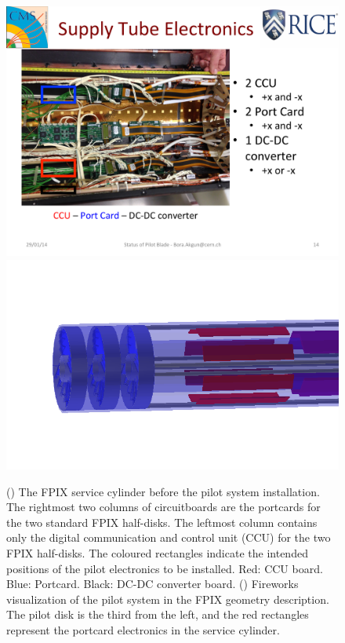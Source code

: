 \begin{figure}[hbtp]
  \begin{center}
    \includegraphics[width=1.24\cmsFigWidth]{figures/pilotelectronics_actual}
    \includegraphics[width=1.24\cmsFigWidth]{figures/PilotGeom_8PortCards2}
    \caption{(\cmsLeft) The FPIX service cylinder before the pilot system installation. The rightmost two columns of circuitboards are the portcards for the two standard FPIX half-disks. The leftmost column contains only the digital communication and control unit (CCU) for the two FPIX half-disks. The coloured rectangles indicate the intended positions of the pilot electronics to be installed. Red: CCU board. Blue: Portcard. Black: DC-DC converter board. (\cmsRight) Fireworks visualization of the pilot system in the FPIX geometry description. The pilot disk is the third from the left, and the red rectangles represent the portcard electronics in the service cylinder.}
    \label{fig:pilotelectronics}
  \end{center}
\end{figure}


